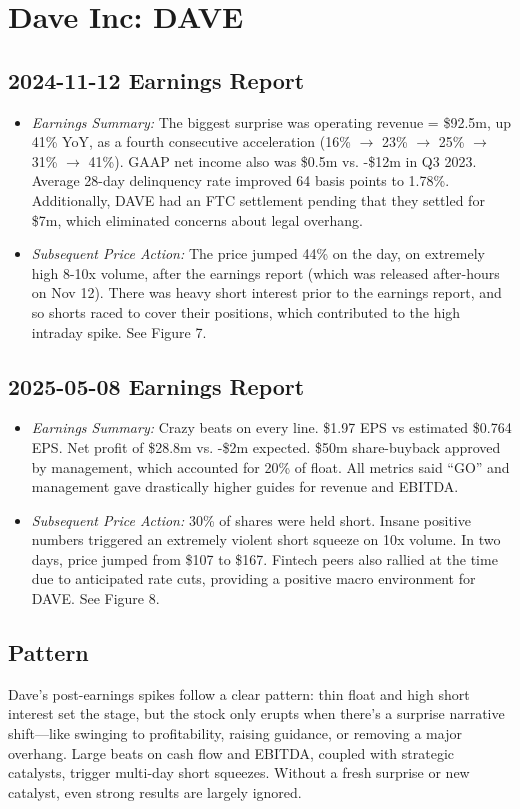 \documentclass[11pt]{article}
\begin{document}
\section{Dave Inc: DAVE}
    \subsection{2024-11-12 Earnings Report}
        \begin{itemize}
            \item \textit{Earnings Summary:} The biggest surprise was operating revenue = \$92.5m, up 41\% YoY, as a fourth consecutive acceleration (16\% $\rightarrow$ 23\% $\rightarrow$ 25\% $\rightarrow$ 31\% $\rightarrow$ 41\%). GAAP net income also was \$0.5m vs. -\$12m in Q3 2023. Average 28-day delinquency rate improved 64 basis points to 1.78\%. Additionally, DAVE had an FTC settlement pending that they settled for \$7m, which eliminated concerns about legal overhang.
            \item \textit{Subsequent Price Action:} The price jumped 44\% on the day, on extremely high 8-10x volume, after the earnings report (which was released after-hours on Nov 12). There was heavy short interest prior to the earnings report, and so shorts raced to cover their positions, which contributed to the high intraday spike. See Figure 7.
        \end{itemize}
    \subsection{2025-05-08 Earnings Report}
        \begin{itemize}
            \item \textit{Earnings Summary:} Crazy beats on every line. \$1.97 EPS vs estimated \$0.764 EPS. Net profit of \$28.8m vs. -\$2m expected. \$50m share-buyback approved by management, which accounted for 20\% of float. All metrics said ``GO'' and management gave drastically higher guides for revenue and EBITDA.
            \item \textit{Subsequent Price Action:} 30\% of shares were held short. Insane positive numbers triggered an extremely violent short squeeze on 10x volume. In two days, price jumped from \$107 to \$167. Fintech peers also rallied at the time due to anticipated rate cuts, providing a positive macro environment for DAVE. See Figure 8.
        \end{itemize}
    \subsection{Pattern}
        Dave’s post-earnings spikes follow a clear pattern: thin float and high short interest set the stage, but the stock only erupts when there's a surprise narrative shift—like swinging to profitability, raising guidance, or removing a major overhang. Large beats on cash flow and EBITDA, coupled with strategic catalysts, trigger multi-day short squeezes. Without a fresh surprise or new catalyst, even strong results are largely ignored.
\end{document}

